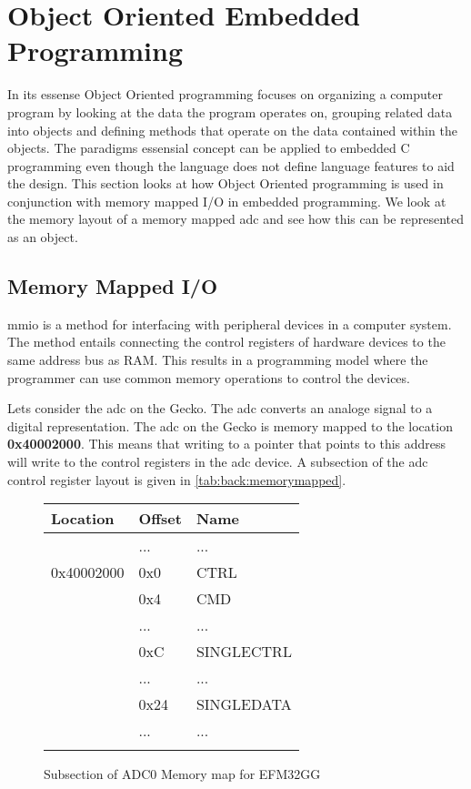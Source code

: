 \section{Object Oriented Embedded Programming}
\label{sec:back:oo}

In its essense Object Oriented programming focuses on organizing a computer program by looking at the data the program operates on, grouping related data into objects and defining methods that operate on the data contained within the objects.
The paradigms essensial concept can be applied to embedded C programming even though the language does not define language features to aid the design.
This section looks at how Object Oriented programming is used in conjunction with memory mapped I/O in embedded programming.
We look at the memory layout of a memory mapped \gls{adc} and see how this can be represented as an object.

\subsection{Memory Mapped I/O}
\gls{mmio} is a method for interfacing with peripheral devices in a computer system.
The method entails connecting the control registers of hardware devices to the same address bus as RAM.
This results in a programming model where the programmer can use common memory operations to control the devices.

Lets consider the \gls{adc} on the Gecko.
The \gls{adc} converts an analoge signal to a digital representation.
The \gls{adc} on the Gecko is memory mapped to the location \textbf{0x40002000}.
This means that writing to a pointer that points to this address will write to the control registers in the \gls{adc} device.
A subsection of the \gls{adc} control register layout is given in \autoref{tab:back:memorymapped}.
\begin{figure}[H]
  \centering
  \begin{tabular}{l|l|l|}
    Location&Offset&Name\\
    \hline
    &...&...\\
    \hline
    \hline
    0x40002000&0x0&CTRL\\
    \hline
    &0x4&CMD\\
    \hline
    &...&...\\
    \hline
    &0xC&SINGLECTRL\\
    \hline
    &...&...\\
    \hline
    &0x24&SINGLEDATA\\
    \hline
    &...&...\\
    \hline
    \hline
    &&\\
  \end{tabular}
  \caption{Subsection of ADC0 Memory map for EFM32GG}
  \label{tab:back:memorymapped}
\end{figure}


